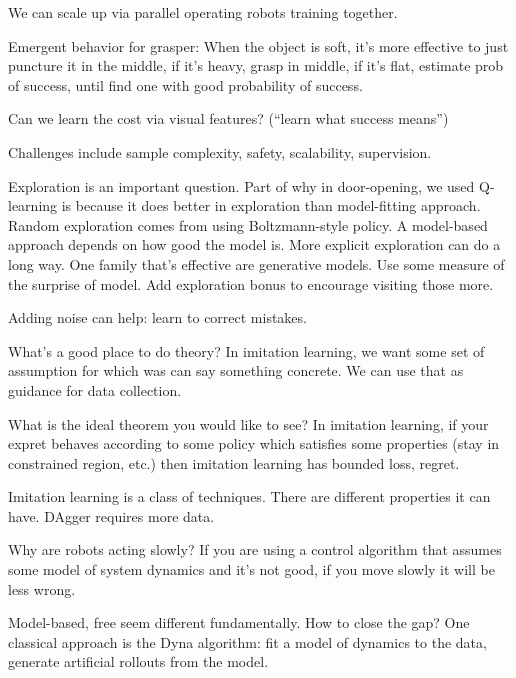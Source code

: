 We can scale up via parallel operating robots training together.

%

Emergent behavior for grasper: 
When the object is soft, it's more effective to just puncture it in the middle, if it's heavy, grasp in middle, if it's flat, estimate prob of success, until find one with good probability of success.


Can we learn the cost via visual features? (``learn what success means'')

Challenges include sample complexity, safety, scalability, supervision.


Exploration is an important question. Part of why in door-opening, we used Q-learning is because it does better in exploration than model-fitting approach. Random exploration comes from using Boltzmann-style policy. A model-based approach depends on how good the model is. More explicit exploration can do a long way. One family that's effective are generative models. Use some measure of the surprise of model. Add exploration bonus to encourage visiting those more. 

Adding noise can help: learn to correct mistakes.


What's a good place to do theory? %
In imitation learning, we want some set of assumption for which was can say something concrete. We can use that as guidance for data collection.

What is the ideal theorem you would like to see? In imitation learning, if your expret behaves according to some policy which satisfies some properties (stay in constrained region, etc.) then imitation learning has bounded loss, regret.

Imitation learning is a class of techniques. There are different properties it can have. DAgger requires more data.

Why are robots acting slowly? If you are using a control algorithm that assumes some model of system dynamics and it's not good, if you move slowly it will be less wrong.

Model-based, free seem different fundamentally. How to close the gap?
One classical approach is the Dyna algorithm: fit a model of dynamics to the data, generate artificial rollouts from the model. 


